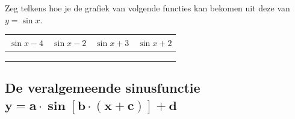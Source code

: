 \documentclass[a4paper,12pt]{article}
\begin{document}
\begin{oefening}
Zeg telkens hoe je de grafiek van volgende functies kan bekomen uit deze van $y=\sin x$.
\begin{center}
  \begin{tabular}{c|c|c|c}
    $\sin x-4$ & $\sin x-2$ & $\sin x+3$ & $\sin x+2$\\
    \hline
    \hspace*{3cm} &\hspace*{3cm}&\hspace*{3cm}&\hspace*{3cm}
    \\
    &&&
    \\
    &&&
  \end{tabular}
\end{center}
\end{oefening}

\subsection{De veralgemeende sinusfunctie $\boldsymbol{y=a\cdot \sin[b\cdot (x+c)]+d}$}
\end{document}
